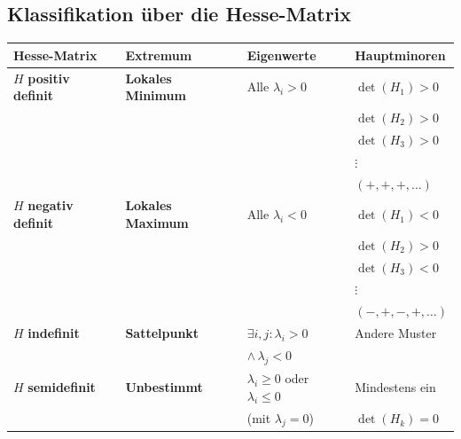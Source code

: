 \documentclass[a4paper,11pt,oneside,open=any,parskip=half, DIV=15]{scrreprt}
\begin{document}
   \subsection*{Klassifikation über die Hesse-Matrix}

      \begin{importantbox}
         \begin{center}
         \renewcommand{\arraystretch}{1.8}
            \begin{tabular}{|>{\centering\arraybackslash}m{3.2cm}|>{\centering\arraybackslash}m{2.8cm}|>{\centering\arraybackslash}m{3.5cm}|>{\centering\arraybackslash}m{4cm}|} %
            \hline   %
            \textbf{Hesse-Matrix} & \textbf{Extremum} & \textbf{Eigenwerte} & \textbf{Hauptminoren} \\
            \hline   %
            \(H\) \textbf{positiv definit} & 
            \textbf{Lokales Minimum} & 
            Alle \(\lambda_i > 0\) & 
            \(\det(H_1) > 0\)\\
            & & & \(\det(H_2) > 0\)\\
            & & & \(\det(H_3) > 0\)\\
            & & & \(\vdots\) \\
            & & & \((+,+,+,\ldots)\) \\
            \hline   %
            \(H\) \textbf{negativ definit} & 
            \textbf{Lokales Maximum} & 
            Alle \(\lambda_i < 0\) & 
            \(\det(H_1) < 0\)\\
            & & & \(\det(H_2) > 0\)\\
            & & & \(\det(H_3) < 0\)\\
            & & & \(\vdots\) \\
            & & & \((-,+,-,+,\ldots)\) \\
            \hline   %
            \(H\) \textbf{indefinit} & 
            \textbf{Sattelpunkt} & 
            \(\exists i,j\colon \lambda_i > 0\) & 
            Andere Muster \\
            & & \(\land \, \lambda_j < 0\) & \\
            \hline   %
            \(H\) \textbf{semidefinit} & 
            \textbf{Unbestimmt} & 
            \(\lambda_i \geq 0\) oder \(\lambda_i \leq 0\) & 
            Mindestens ein \\
            & & (mit \(\lambda_j = 0\)) & \(\det(H_k) = 0\) \\
            \hline   %
            \end{tabular}
         \end{center}
      \end{importantbox}
\end{document}
